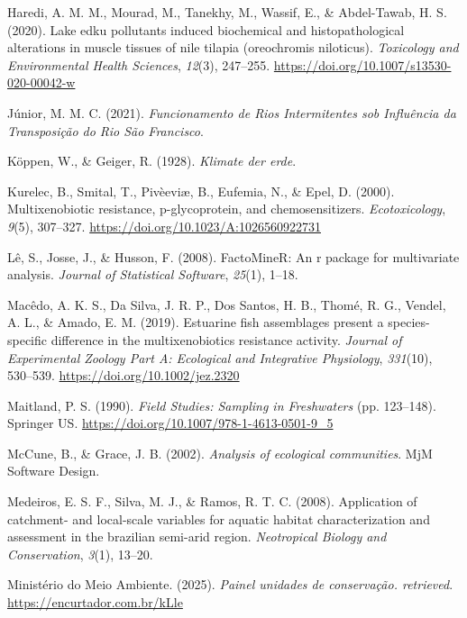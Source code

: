\documentclass[
  american,
  letterpaper,
  DIV=11,
  numbers=noendperiod]{scrartcl}
\newlength{\cslhangindent}
\newenvironment{CSLReferences}[2] %
 {\begin{list}{}{%
  \setlength{\itemindent}{0pt}
  \setlength{\leftmargin}{0pt}
  \setlength{\parsep}{0pt}
  \ifodd #1
   \setlength{\leftmargin}{\cslhangindent}
   \setlength{\itemindent}{-1\cslhangindent}
  \fi
  \setlength{\itemsep}{#2\baselineskip}}}
 {\end{list}}
\begin{document}
\begin{CSLReferences}{1}{0}
Haredi, A. M. M., Mourad, M., Tanekhy, M., Wassif, E., \& Abdel-Tawab,
H. S. (2020). Lake edku pollutants induced biochemical and
histopathological alterations in muscle tissues of nile tilapia
(oreochromis niloticus). \emph{Toxicology and Environmental Health
Sciences}, \emph{12}(3), 247--255.
\url{https://doi.org/10.1007/s13530-020-00042-w}

Júnior, M. M. C. (2021). \emph{Funcionamento de Rios Intermitentes sob
Influência da Transposição do Rio São Francisco}.

Köppen, W., \& Geiger, R. (1928). \emph{Klimate der erde}.

Kurelec, B., Smital, T., Pivèeviæ, B., Eufemia, N., \& Epel, D. (2000).
Multixenobiotic resistance, p-glycoprotein, and chemosensitizers.
\emph{Ecotoxicology}, \emph{9}(5), 307--327.
\url{https://doi.org/10.1023/A:1026560922731}

Lê, S., Josse, J., \& Husson, F. (2008). FactoMineR: An r package for
multivariate analysis. \emph{Journal of Statistical Software},
\emph{25}(1), 1--18.

Macêdo, A. K. S., Da Silva, J. R. P., Dos Santos, H. B., Thomé, R. G.,
Vendel, A. L., \& Amado, E. M. (2019). Estuarine fish assemblages
present a species{-}specific difference in the multixenobiotics
resistance activity. \emph{Journal of Experimental Zoology Part A:
Ecological and Integrative Physiology}, \emph{331}(10), 530--539.
\url{https://doi.org/10.1002/jez.2320}

Maitland, P. S. (1990). \emph{Field Studies: Sampling in Freshwaters}
(pp. 123--148). Springer US.
\url{https://doi.org/10.1007/978-1-4613-0501-9_5}

McCune, B., \& Grace, J. B. (2002). \emph{Analysis of ecological
communities}. MjM Software Design.

Medeiros, E. S. F., Silva, M. J., \& Ramos, R. T. C. (2008). Application
of catchment- and local-scale variables for aquatic habitat
characterization and assessment in the brazilian semi-arid region.
\emph{Neotropical Biology and Conservation}, \emph{3}(1), 13--20.

Ministério do Meio Ambiente. (2025). \emph{Painel unidades de
conservação. retrieved}. \url{https://encurtador.com.br/kLle}


\end{CSLReferences}
\end{document}
